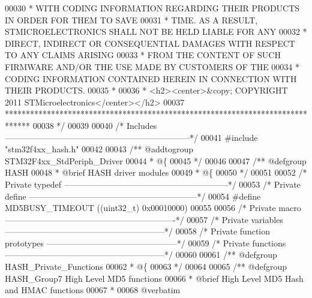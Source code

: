 \begin{DoxyCode}
00030 \textcolor{comment}{  * WITH CODING INFORMATION REGARDING THEIR PRODUCTS IN ORDER FOR THEM TO SAVE}
00031 \textcolor{comment}{  * TIME. AS A RESULT, STMICROELECTRONICS SHALL NOT BE HELD LIABLE FOR ANY}
00032 \textcolor{comment}{  * DIRECT, INDIRECT OR CONSEQUENTIAL DAMAGES WITH RESPECT TO ANY CLAIMS ARISING}
00033 \textcolor{comment}{  * FROM THE CONTENT OF SUCH FIRMWARE AND/OR THE USE MADE BY CUSTOMERS OF THE}
00034 \textcolor{comment}{  * CODING INFORMATION CONTAINED HEREIN IN CONNECTION WITH THEIR PRODUCTS.}
00035 \textcolor{comment}{  *}
00036 \textcolor{comment}{  * <h2><center>&copy; COPYRIGHT 2011 STMicroelectronics</center></h2>}
00037 \textcolor{comment}{  ******************************************************************************}
00038 \textcolor{comment}{  */}
00039 
00040 \textcolor{comment}{/* Includes ------------------------------------------------------------------*/}
00041 \textcolor{preprocessor}{#}\textcolor{preprocessor}{include} "stm32f4xx_hash.h"
00042 
00043 \textcolor{comment}{/** @addtogroup STM32F4xx\_StdPeriph\_Driver}
00044 \textcolor{comment}{  * @\{}
00045 \textcolor{comment}{  */}
00046 
00047 \textcolor{comment}{/** @defgroup HASH }
00048 \textcolor{comment}{  * @brief HASH driver modules}
00049 \textcolor{comment}{  * @\{}
00050 \textcolor{comment}{  */}
00051 
00052 \textcolor{comment}{/* Private typedef -----------------------------------------------------------*/}
00053 \textcolor{comment}{/* Private define ------------------------------------------------------------*/}
00054 \textcolor{preprocessor}{#}\textcolor{preprocessor}{define} \textcolor{preprocessor}{MD5BUSY\_TIMEOUT}    \textcolor{preprocessor}{(}\textcolor{preprocessor}{(}\textcolor{preprocessor}{uint32\_t}\textcolor{preprocessor}{)} 0x00010000\textcolor{preprocessor}{)}
00055 
00056 \textcolor{comment}{/* Private macro -------------------------------------------------------------*/}
00057 \textcolor{comment}{/* Private variables ---------------------------------------------------------*/}
00058 \textcolor{comment}{/* Private function prototypes -----------------------------------------------*/}
00059 \textcolor{comment}{/* Private functions ---------------------------------------------------------*/}
00060 
00061 \textcolor{comment}{/** @defgroup HASH\_Private\_Functions}
00062 \textcolor{comment}{  * @\{}
00063 \textcolor{comment}{  */}
00064 
00065 \textcolor{comment}{/** @defgroup HASH\_Group7 High Level MD5 functions}
00066 \textcolor{comment}{ *  @brief   High Level MD5 Hash and HMAC functions }
00067 \textcolor{comment}{ *}
00068 \textcolor{comment}{@verbatim   }

\end{DoxyCode}
